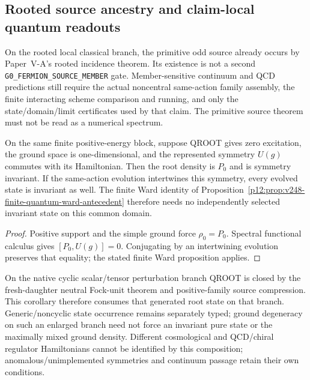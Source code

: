 \documentclass[12pt,a4paper]{article}
\begin{document}
\subsection{Rooted source ancestry and claim-local quantum readouts}
\label{p12:sec:v2109-source-observable-transport}
On the rooted local classical branch, the primitive odd source already
occurs by Paper~V-A's rooted incidence theorem.  Its existence is not a
second \texttt{G0\_FERMION\_SOURCE\_MEMBER} gate.  Member-sensitive
continuum and QCD predictions still require the actual noncentral
same-action family assembly, the finite interacting scheme comparison and
running, and only the state/domain/limit certificates used by that claim.
The primitive source theorem must not be read as a numerical spectrum.

\begin{corollary}
\label{p12:cor:v2109-qroot-ward-state}
On the same finite positive-energy block, suppose QROOT gives zero
excitation, the ground space is one-dimensional, and the represented
symmetry \(U(g)\) commutes with its Hamiltonian.  Then the root density is
\(P_0\) and is symmetry invariant.  If the same-action evolution
intertwines this symmetry, every evolved state is invariant as well.
The finite Ward identity of
Proposition~\ref{p12:prop:v248-finite-quantum-ward-antecedent} therefore
needs no independently selected invariant state on this common domain.
\end{corollary}
\begin{proof}
Positive support and the simple ground force \(\rho_0=P_0\).
Spectral functional calculus gives \([P_0,U(g)]=0\).  Conjugating by an
intertwining evolution preserves that equality; the stated finite Ward
proposition applies.
\end{proof}
On the native cyclic scalar/tensor perturbation branch QROOT is closed by the
fresh-daughter neutral Fock-unit theorem and positive-family source
compression.  This corollary therefore consumes that generated root state on
that branch.  Generic/noncyclic state occurrence remains separately typed;
ground degeneracy on such an enlarged branch need not force an invariant pure
state or the maximally mixed ground density.  Different cosmological and
QCD/chiral regulator Hamiltonians cannot be identified by this composition;
anomalous/unimplemented symmetries and continuum passage retain their own
conditions.
\end{document}
